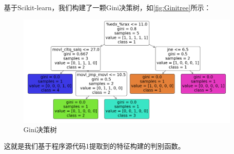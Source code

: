 基于Scikit-learn\cite{scikit-learn}，我们构建了一颗Gini决策树，如\autoref{fig:Ginitree}所示：
\begin{figure}[H]
	\centering
	\includegraphics[width=1\linewidth]{figures/Ginitree.png}
	\caption{Gini决策树}
	\label{fig:Ginitree}
\end{figure}
这就是我们基于程序源代码1提取到的特征构建的判别函数。
\vspace*{1cm}
